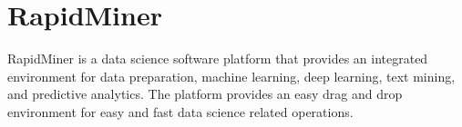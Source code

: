 \section{RapidMiner}

RapidMiner is a data science software platform that provides an integrated environment for data preparation, machine learning, deep learning, text mining, and predictive analytics. The platform provides an easy drag and drop environment for easy and fast data science related operations\cites{hid-sp18-511-rapidminer}.
